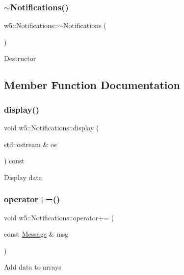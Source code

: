 \subsubsection{\texorpdfstring{$\sim$\+Notifications()}{~Notifications()}}
{\footnotesize\ttfamily w5\+::\+Notifications\+::$\sim$\+Notifications (\begin{DoxyParamCaption}{ }\end{DoxyParamCaption})}

Destructor 

\subsection{Member Function Documentation}
\mbox{\label{classw5_1_1_notifications_a0272d577ac9277d500118d635b460670}} 
\subsubsection{\texorpdfstring{display()}{display()}}
{\footnotesize\ttfamily void w5\+::\+Notifications\+::display (\begin{DoxyParamCaption}\item[{std\+::ostream \&}]{os }\end{DoxyParamCaption}) const}

Display data \mbox{\label{classw5_1_1_notifications_ab6331b2dc2d9af68e462fdaecb74b43d}} 
\subsubsection{\texorpdfstring{operator+=()}{operator+=()}}
{\footnotesize\ttfamily void w5\+::\+Notifications\+::operator+= (\begin{DoxyParamCaption}\item[{const \mbox{\hyperlink{classw5_1_1_message}{Message}} \&}]{msg }\end{DoxyParamCaption})}

Add data to arrays \mbox{\label{classw5_1_1_notifications_ac46f701bd1bc9acad70d75217554baca}} 
